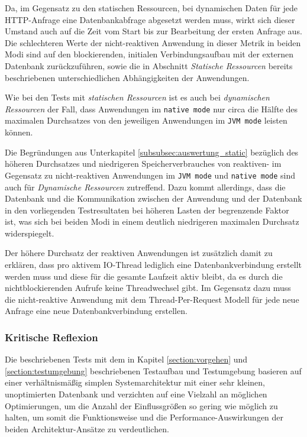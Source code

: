 Da, im Gegensatz zu den statischen Ressourcen, bei dynamischen Daten für jede HTTP-Anfrage eine Datenbankabfrage abgesetzt werden
muss, wirkt sich dieser Umstand auch auf die Zeit vom Start bis zur Bearbeitung der ersten Anfrage aus.
Die schlechteren Werte der nicht-reaktiven Anwendung in dieser Metrik in beiden Modi sind auf den blockierenden, initialen
Verbindungsaufbau mit der externen Datenbank zurückzuführen, sowie die in Abschnitt \textit{Statische Ressourcen} bereits
beschriebenen unterschiedlichen Abhängigkeiten der Anwendungen.

Wie bei den Tests mit \textit{statischen Ressourcen} ist es auch bei \textit{dynamischen Ressourcen} der Fall, dass Anwendungen im
\verb|native mode| nur circa die Hälfte des maximalen Durchsatzes von den jeweiligen Anwendungen im \verb|JVM mode| leisten können.

Die Begründungen aus Unterkapitel \ref{subsubsec:auswertung_static} bezüglich des höheren Durchsatzes und niedrigeren Speicherverbrauches
von reaktiven- im Gegensatz zu nicht-reaktiven Anwendungen im \verb|JVM mode| und \verb|native mode| sind auch für
\textit{Dynamische Ressourcen} zutreffend.
Dazu kommt allerdings, dass die Datenbank und die Kommunikation zwischen der Anwendung und der Datenbank in den vorliegenden Testresultaten
bei höheren Lasten der begrenzende Faktor ist, was sich bei beiden Modi in einem deutlich niedrigeren maximalen Durchsatz widerspiegelt.

Der höhere Durchsatz der reaktiven Anwendungen ist zusätzlich damit zu erklären, dass pro aktivem IO-Thread lediglich eine
Datenbankverbindung erstellt werden muss und diese für die gesamte Laufzeit aktiv bleibt, da es durch die nichtblockierenden
Aufrufe keine Threadwechsel gibt. Im Gegensatz dazu muss die nicht-reaktive Anwendung mit dem Thread-Per-Request Modell
für jede neue Anfrage eine neue Datenbankverbindung erstellen.
\newpage

\subsubsection{Kritische Reflexion}
\label{subsubsec:auswertung_kritische_reflexion}
Die beschriebenen Tests mit dem in Kapitel \ref{section:vorgehen} und \ref{section:testumgebung} beschriebenen Testaufbau und Testumgebung
basieren auf einer verhältnismäßig simplen Systemarchitektur mit einer sehr kleinen, unoptimierten Datenbank und verzichten auf eine
Vielzahl an möglichen Optimierungen, um die Anzahl der Einflussgrößen so gering wie möglich zu halten, um somit die Funktionsweise und die
Performance-Auswirkungen der beiden Architektur-Ansätze zu verdeutlichen.

